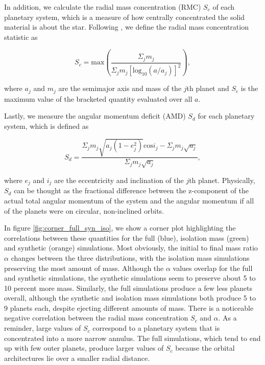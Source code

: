 In addition, we calculate the radial mass concentration (RMC) $S_{c}$ of each planetary system, which is a measure of how centrally concentrated the solid material is about the star. Following \cite{chambers01}, we define the radial mass concentration statistic as

\begin{equation}\label{eq:rmc}
	S_{c} = \mathrm{max} \left( \frac{\Sigma_{j} m_{j}}{\Sigma_{j} m_{j} \left[ \mathrm{log}_{10} \left( a / a_{j} \right) \right]^{2}} \right),
\end{equation}

\noindent where $a_{j}$ and $m_{j}$ are the semimajor axis and mass of the $j$th planet and $S_{c}$ is the maximum value of the bracketed quantity evaluated over all $a$.

Lastly, we measure the angular momentum deficit (AMD) $S_{d}$ for each planetary system, which is defined as

\begin{equation}\label{eq:amd}
	S_{d} = \frac{\Sigma_{j} m_{j} \sqrt{a_{j} \left( 1 - e_{j}^2 \right)} \mathrm{cos} i_{j} - \Sigma_{j} m_{j} \sqrt{a_{j}}}{\Sigma_{j} m_{j} \sqrt{a_{j}}},
\end{equation}

\noindent \cite{laskar97, chambers01} where $e_{j}$ and $i_{j}$ are the eccentricity and inclination of the $j$th planet. Physically, $S_{d}$ can be thought as the fractional difference between the z-component of the actual total angular momentum of the system and the angular momentum if all of the planets were on circular, non-inclined orbits.

In figure \ref{fig:corner_full_syn_iso}, we show a corner plot highlighting the correlations between these quantities for the full (blue), isolation mass (green) and synthetic (orange) simulations. Most obviously, the initial to final mass ratio $\alpha$ changes between the three distributions, with the isolation mass simulations preserving the most amount of mass. Although the $\alpha$ values overlap for the full and synthetic simulations, the synthetic simulations seem to preserve about 5 to 10 percent more mass. Similarly, the full simulations produce a few less planets overall, although the synthetic and isolation mass simulations both produce 5 to 9 planets each, despite ejecting different amounts of mass. There is a noticeable negative correlation between the radial mass concentration $S_{c}$ and $\alpha$. As a reminder, large values of $S_{c}$ correspond to a planetary system that is concentrated into a more narrow annulus. The full simulations, which tend to end up with few outer planets, produce larger values of $S_{c}$ because the orbital architectures lie over a smaller radial distance.

